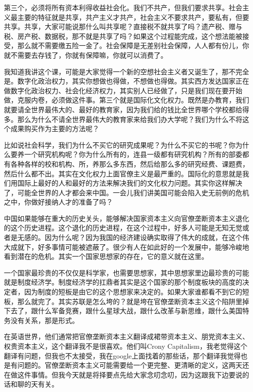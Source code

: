 \documentclass[UTF8, 12pt, a4paper]{ctexrep}
\begin{document}
第三个，必须将所有资本利得收益社会化。我们不共产，但我们要求共享。社会主义最主要的特征就是共享，共产主义才共产，社会主义不要求共产，要私有，但要共享。共享，大家可能说那什么叫共享呢？直接税不就共享了吗？遗产税、赠与税、房产税、数据税，那不就是共享了吗？如果这个过程能完成，这个想法能被接受，那么就不需要缴五险一金了。社会保障是无差别社会保障，人人都有份儿，你就不需要去存钱了，你就有保障嘛，你就可以消费了。

我知道我讲这个课，可能是大家觉得一个新的空想社会主义者又诞生了，那不完全是。数字化政治权力，其实你想做也得做，不想做也得做。其实西方发达国家正在做数字化政治权力、社会化经济权力，其实别人已经做了，只是我们现在要开始做，克服内卷，必须做这件事。第三个就是国际化文化权力。既然是办教育，我们就要请全世界最伟大的、最好的教育家，因为我们给的钱比全世界哪个学校都给得多。那么为什么不请全世界最伟大的教育家来给我们办大学呢？我们为什么不将这个成果购买作为主要的方法呢？

比如说社会科学，我们为什么不买它的研究成果呢？为什么不买它的书呢？你为什么要养一个研究机构呢？你为什么所有的，连县一级都有研究机构？所有的部委都有各种各样的校和机构、所，养那么多东西，然后给那么多的研究经费、课题费，然后什么都不出。其实在文化权力上面官僚主义是最严重的。国际化的意思就是我们用国际上最好的人和最好的方法来解决我们的文化权力问题。其实你这样解决了，可能全世界的人才都会来中国。一会儿我们讲美国可能会陷入史无前例的危机之中，你做好接纳人才的准备了吗？

中国如果能够在重大的历史关头，能够解决国家资本主义向官僚垄断资本主义退化的这个历史进程。这个退化的历史进程，在这个过程中，好多人可能是无知无觉或者是无感的。因为什么呢？因为我国的经济建设确实取得了伟大的成就，在这个伟大成就下，好多事情可能被遮蔽了。很少有人在如此好的一个发展中，能够冷峻地看到潜在的危机。其实一个国家思想家的存在，它的意义就在这里。

一个国家最珍贵的不仅仅是科学家，也需要思想家，其中思想家里边最珍贵的可能就是制度经济学。制度经济学的扛鼎者其实是这个国家的那个制度板块的高度的决定者，因为制度的短板是由它的这个思想家来决定的。如果大家谁都看不到它的短板，那么就完了。其实苏联是怎么垮的？就是垮在官僚垄断资本主义这个陷阱里掉下去了，跟什么军备竞赛，跟什么星球大战，跟什么改革与新思维，跟什么美国特务没有关系，那是形式。

在英语世界，他们通常把官僚垄断资本主义翻译成裙带资本主义、朋党资本主义、权贵资本主义，这个翻译我不是很喜欢。他们叫Crony Capitalism，我老觉得这个翻译有问题，但我也不太接受，我在google上面找着的那些话，那个翻译我觉得也是有问题的。官僚垄断资本主义可能需要给一个更完整、更清晰的定义，这两天还在做这件事情。但我今天就是将择要点先给大家念叨念叨，因为这跟我下边要说的话和聊的天有关。
\end{document}
